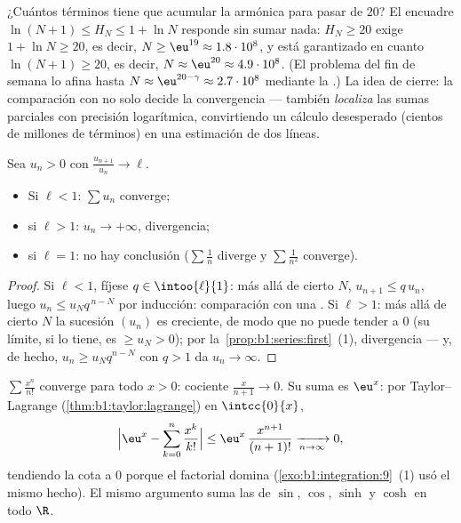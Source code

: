 \begin{example}\label{ex:b1:series:harmonicstack}
¿Cuántos términos tiene que acumular la  armónica para pasar de
$20$? El encuadre $\ln(N+1) \leq H_N \leq 1 + \ln N$ responde sin
sumar nada: $H_N \geq 20$ exige $1 + \ln N \geq 20$, es decir,
$N \geq \eu^{19} \approx 1.8\cdot10^{8}$, y está garantizado en
cuanto $\ln(N + 1) \geq 20$, es decir, $N \approx \eu^{20} \approx
4.9\cdot10^{8}$. (El problema del fin de semana lo afina hasta
$N \approx \eu^{20 - \gamma} \approx 2.7\cdot10^{8}$ mediante la
.)
La idea de cierre: la comparación con  no solo decide la
convergencia --- también \emph{localiza} las sumas parciales con
precisión logarítmica, convirtiendo un cálculo desesperado (cientos
de millones de términos) en una estimación de dos líneas.
\end{example}

\begin{theorem}\label{thm:b1:series:ratio}
Sea $u_n > 0$ con $\frac{u_{n+1}}{u_n} \to \ell$.
\begin{itemize}
  \item Si $\ell < 1$: $\sum u_n$ converge;
  \item si $\ell > 1$: $u_n \to +\infty$, divergencia;
  \item si $\ell = 1$: no hay conclusión ($\sum \frac1n$ diverge y
        $\sum \frac{1}{n^2}$ converge).
\end{itemize}
\end{theorem}

\begin{proof}
Si $\ell < 1$, fíjese $q \in \intoo{\ell}{1}$: más allá de cierto $N$,
$u_{n+1} \leq q\,u_n$, luego $u_n \leq u_N q^{\,n-N}$ por inducción:
comparación con una . Si $\ell > 1$: más allá de
cierto $N$ la sucesión $(u_n)$ es creciente, de modo que no puede
tender a $0$ (su límite, si lo tiene, es $\geq u_N > 0$); por
la~\cref{prop:b1:series:first}~(1), divergencia --- y, de hecho,
$u_n \geq u_N q^{n-N}$ con $q > 1$ da $u_n \to \infty$.
\end{proof}

\begin{example}\label{ex:b1:series:ratio}
$\sum \frac{x^n}{n!}$ converge para todo $x > 0$: cociente
$\frac{x}{n+1} \to 0$. Su suma es $\eu^x$: por Taylor--Lagrange
(\cref{thm:b1:taylor:lagrange}) en $\intcc{0}{x}$,
\[
\Bigl| \eu^x - \sum_{k=0}^{n} \frac{x^k}{k!} \Bigr|
\leq \eu^{x}\, \frac{x^{n+1}}{(n+1)!} \xrightarrow[n\to\infty]{} 0 ,
\]
tendiendo la cota a $0$ porque el factorial domina
(\cref{exo:b1:integration:9}~(1) usó el mismo hecho). El mismo
argumento suma las  de $\sin$, $\cos$, $\sinh$ y $\cosh$ en
todo $\R$.
\end{example}

